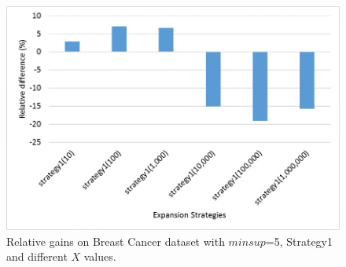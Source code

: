 %
%
%
%
%
\begin{figure}[!t]
\includegraphics[width=5in]{immagini_extension/breast_strategy1.png}
\caption{Relative gains on Breast Cancer dataset with $minsup$=5, Strategy1 and different $X$ values.
}
\label{breast_strategy1}
\end{figure}

